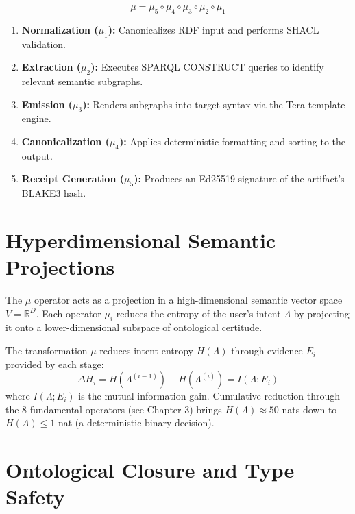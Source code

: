 \begin{equation}
    \mu = \mu_5 \circ \mu_4 \circ \mu_3 \circ \mu_2 \circ \mu_1
\end{equation}

\begin{enumerate}
    \item \textbf{Normalization ($\mu_1$):} Canonicalizes RDF input and performs SHACL validation.
    \item \textbf{Extraction ($\mu_2$):} Executes SPARQL CONSTRUCT queries to identify relevant semantic subgraphs.
    \item \textbf{Emission ($\mu_3$):} Renders subgraphs into target syntax via the Tera template engine.
    \item \textbf{Canonicalization ($\mu_4$):} Applies deterministic formatting and sorting to the output.
    \item \textbf{Receipt Generation ($\mu_5$):} Produces an Ed25519 signature of the artifact's BLAKE3 hash.
\end{enumerate}

\section{Hyperdimensional Semantic Projections}

The $\mu$ operator acts as a projection in a high-dimensional semantic vector space $V = \mathbb{R}^D$. Each operator $\mu_i$ reduces the entropy of the user's intent $\Lambda$ by projecting it onto a lower-dimensional subspace of ontological certitude.

\begin{theorem}
    The transformation $\mu$ reduces intent entropy $H(\Lambda)$ through evidence $E_i$ provided by each stage:
    \begin{equation}
        \Delta H_i = H(\Lambda^{(i-1)}) - H(\Lambda^{(i)}) = I(\Lambda; E_i)
    \end{equation}
    where $I(\Lambda; E_i)$ is the mutual information gain. Cumulative reduction through the 8 fundamental operators (see Chapter 3) brings $H(\Lambda) \approx 50$ nats down to $H(A) \leq 1$ nat (a deterministic binary decision).
\end{theorem}

\section{Ontological Closure and Type Safety}

